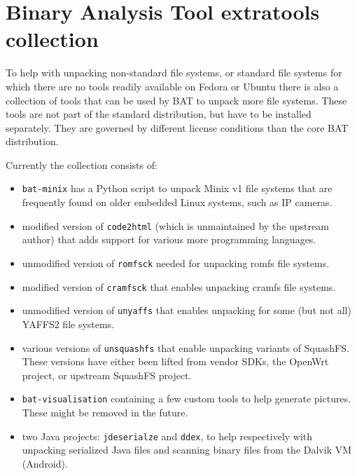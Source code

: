 \documentclass[10pt]{article}
\begin{document}


\section{Binary Analysis Tool extratools collection}

To help with unpacking non-standard file systems, or standard file systems for
which there are no tools readily available on Fedora or Ubuntu there is also
a collection of tools that can be used by BAT to unpack more file systems.
These tools are not part of the standard distribution, but have to be installed
separately. They are governed by different license conditions than the core BAT
distribution.

Currently the collection consists of:

\begin{itemize}
\item \texttt{bat-minix} has a Python script to unpack Minix v1 file systems
that are frequently found on older embedded Linux systems, such as IP cameras.
\item modified version of \texttt{code2html} (which is unmaintained by the
upstream author) that adds support for various more programming languages.
\item unmodified version of \texttt{romfsck} needed for unpacking romfs file
systems.
\item modified version of \texttt{cramfsck} that enables unpacking cramfs
file systems.
\item unmodified version of \texttt{unyaffs} that enables unpacking for some
(but not all) YAFFS2 file systems.
\item various versions of \texttt{unsquashfs} that enable unpacking variants
of SquashFS. These versions have either been lifted from vendor SDKs, the
OpenWrt project, or upstream SquashFS project.
\item \texttt{bat-visualisation} containing a few custom tools to help generate
pictures. These might be removed in the future.
\item two Java projects: \texttt{jdeserialze} and \texttt{ddex}, to help
respectively with unpacking serialized Java files and scanning binary files
from the Dalvik VM (Android).
\end{itemize}
\end{document}

